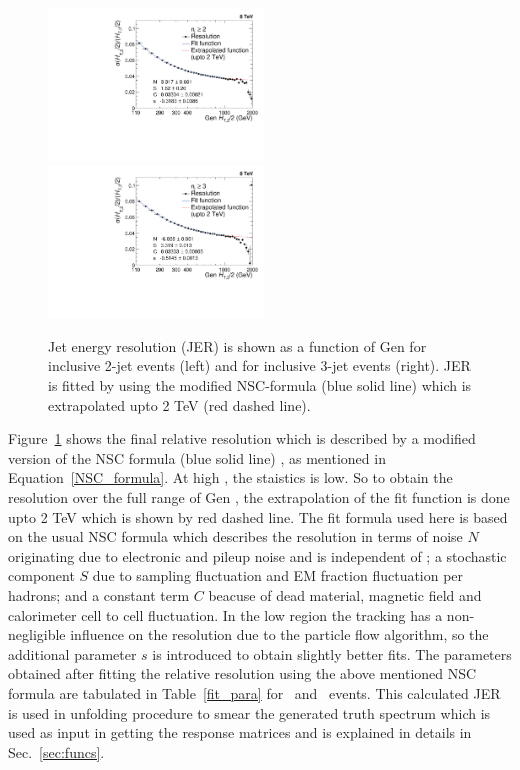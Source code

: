 \begin{figure}[!htbp]
 \begin{center}
 \includegraphics[width=0.51\textwidth]{Plots_HT_2_150/Extrapolate_Sigma_Value_Res_2_crystal_range.pdf}%
 ~~\includegraphics[width=0.51\textwidth]{Plots_HT_2_150/Extrapolate_Sigma_Value_Res_3_crystal.pdf}
 \caption{Jet energy resolution (JER) is shown as a function of Gen \httwo for inclusive 2-jet events (left) and for inclusive 3-jet events (right). JER is fitted by using the modified NSC-formula (blue solid line) which is extrapolated upto 2 TeV (red dashed line).}
    \label{fig:resolution}
  \end{center}
\end{figure}
 
Figure~\ref{fig:resolution} shows the final relative resolution which is described by a modified version of the NSC formula (blue solid line) \cite{CMS:2011esa}, as mentioned in Equation~\ref{NSC_formula}. At high \httwo, the staistics is low. So to obtain the resolution over the full range of Gen \httwons, the extrapolation of the fit function is done upto 2 TeV which is shown by red dashed line. The fit formula used here is based on the usual NSC formula which describes the resolution in terms of noise $N$ originating due to electronic and pileup noise and is independent of \httwons; a stochastic component $S$ due to sampling fluctuation and EM fraction fluctuation per hadrons; and a constant term $C$ beacuse of dead material, magnetic field and calorimeter cell to cell fluctuation. In the low \httwo region the tracking has a non-negligible influence on the resolution due to the particle flow algorithm, so the additional parameter $s$ is introduced to obtain slightly better fits. The parameters obtained after fitting the relative resolution using the above mentioned NSC formula are tabulated in Table~\ref{fit_para} for \njt~and \njth~events. This calculated JER is used in unfolding procedure to smear the generated truth spectrum which is used as input in getting the response matrices and is explained in details in Sec.~\ref{sec:funcs}.

